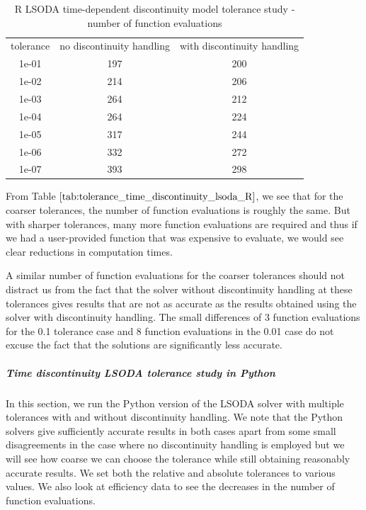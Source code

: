 \begin{table}[H]
\caption {R LSODA time-dependent discontinuity model tolerance study - number of function evaluations} \label{tab:tolerance_time_discontinuity_lsoda_R} 
\begin{center}
\begin{tabular}{ c c c }
tolerance & no discontinuity handling & with discontinuity handling \\ 
1e-01 & 197 & 200 \\
1e-02 & 214 & 206 \\
1e-03 & 264 & 212 \\
1e-04 & 264 & 224 \\
1e-05 & 317 & 244 \\
1e-06 & 332 & 272 \\
1e-07 & 393 & 298 \\
\end{tabular}
\end{center}
\end{table}

From Table $\ref{tab:tolerance_time_discontinuity_lsoda_R}$, we see that for the coarser tolerances, the number of function evaluations is roughly the same. But with sharper tolerances, many more function evaluations are required and thus if we had a user-provided function that was expensive to evaluate, we would see clear reductions in computation times.

A similar number of function evaluations for the coarser tolerances should not distract us from the fact that the solver without discontinuity handling at these tolerances gives results that are not as accurate as the results obtained using the solver with discontinuity handling. The small differences of 3 function evaluations for the 0.1 tolerance case and 8 function evaluations in the 0.01 case do not excuse the fact that the solutions are significantly less accurate.

\subparagraph{Time discontinuity LSODA tolerance study in Python}
In this section, we run the Python version of the LSODA solver with multiple tolerances with and without discontinuity handling. We note that the Python solvers give sufficiently accurate results in both cases apart from some small disagreements in the case where no discontinuity handling is employed but we will see how coarse we can choose the tolerance while still obtaining reasonably accurate results. We set both the relative and absolute tolerances to various values. We also look at efficiency data to see the decreases in the number of function evaluations.


